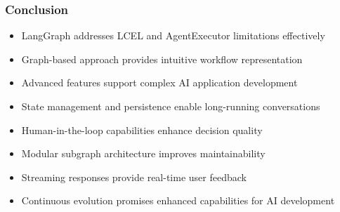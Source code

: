 \begin{frame}[fragile]\frametitle{Conclusion}
      \begin{itemize}
        \item LangGraph addresses LCEL and AgentExecutor limitations effectively
        \item Graph-based approach provides intuitive workflow representation
        \item Advanced features support complex AI application development
        \item State management and persistence enable long-running conversations
        \item Human-in-the-loop capabilities enhance decision quality
        \item Modular subgraph architecture improves maintainability
        \item Streaming responses provide real-time user feedback
        \item Continuous evolution promises enhanced capabilities for AI development
      \end{itemize}
\end{frame}